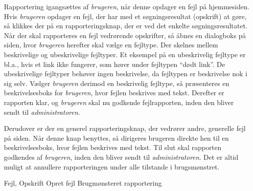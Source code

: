 {Rapportering igangsættes af \textit{brugeren}, når denne opdager en fejl på hjemmesiden. Hvis \textit{brugeren} opdager en fejl, der har med et søgningsresultat (opskrift) at gøre, så klikkes der på en rapporteringsknap, der er ved det enkelte søgningsresultatet. Når der skal rapporteres en fejl vedrørende opskrifter, så åbnes en dialogboks på siden, hvor \textit{brugeren} herefter skal vælge en fejltype. Der skelnes mellem beskrivelige og ubeskrivelige fejltyper. Et eksempel på en ubeskrivelig fejltype er bl.a., hvis et link ikke fungerer, som hører under fejltypen “dødt link”. De ubeskrivelige fejltyper behøver ingen beskrivelse, da fejltypen er beskrivelse nok i sig selv. Vælger \textit{brugeren} derimod en beskrivelig fejltype, så præsenteres en beskrivelsesboks for \textit{brugeren}, hvor fejlen beskrives med tekst. Derefter er rapporten klar, og \textit{brugeren} skal nu godkende fejlrapporten, inden den bliver sendt til \textit{administratoren}.

Derudover er der en generel rapporteringsknap, der vedrører andre, generelle fejl på siden. Når denne knap benyttes, så dirigeres brugeren direkte hen til en beskrivelsesboks, hvor fejlen beskrives med tekst. Til slut skal rapporten godkendes af \textit{brugeren}, inden den bliver sendt til \textit{administratoren}. Det er altid muligt at annullere rapporteringen under alle tilstande i brugsmønstret.}
{Fejl, Opskrift}
{Opret fejl}
{Brugmønsteret rapportering}
